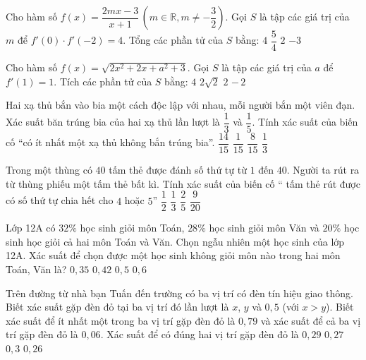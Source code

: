 \begin{ex}
Cho hàm số $f(x)=\dfrac{2mx-3}{x+1}\,\left(m\in \mathbb{R},m\ne -\dfrac{3}{2}\right)$. Gọi $S$ là tập các giá trị của $m$ để $f'(0) \cdot f'(-2)=4$. Tổng các phần tử của $S$ bằng:
\choice
{$4$}
{$\dfrac{5}{4}$}
{$2$}
{$-3$}
\end{ex}
\begin{ex}
Cho hàm số $f(x)=\sqrt{2x^2+2x+a^2+3}$. Gọi $S$ là tập các giá trị của $a$ để $f'(1)=1$. Tích các phần tử của $S$ bằng:
\choice
{$4$}
{$2\sqrt{2}$}
{$2$}
{$-\,2$}
\end{ex}
\begin{ex}
Hai xạ thủ bắn vào bia một cách độc lập với nhau, mỗi người bắn một viên đạn. Xác suất băn trúng bia của hai xạ thủ lần lượt là $\dfrac{1}{3}$ và $\dfrac{1}{5}$. Tính xác suất của biến cố “có ít nhất một xạ thủ không bắn trúng bia”.
\choice
{$\dfrac{14}{15}$}
{$\dfrac{1}{15}$}
{$\dfrac{8}{15}$}
{$\dfrac{1}{3}$}
\end{ex}
\begin{ex}
Trong một thùng có $40$ tấm thẻ được đánh số thứ tự từ $1$ đến $40$. Người ta rút ra từ thùng phiếu một tấm thẻ bất kì. Tính xác suất của biến cố “ tấm thẻ rút được có số thứ tự chia hết cho $4$ hoặc $5$”
\choice
{$\dfrac{1}{2}$}
{$\dfrac{1}{3}$}
{$\dfrac{2}{5}$}
{$\dfrac{9}{20}$}
\end{ex}
\begin{ex}
Lớp 12A có $32\%$ học sinh giỏi môn Toán, $28\%$ học sinh giỏi môn Văn và $20\%$ học sinh học giỏi cả hai môn Toán và Văn. Chọn ngẫu nhiên một học sinh của lớp 12A. Xác suất để chọn được một học sinh không giỏi môn nào trong hai môn Toán, Văn là?
\choice
{$0{,}35$}
{$0{,}42$}
{$0{,}5$}
{$0{,}6$}
\end{ex}
\begin{ex}
Trên đường từ nhà bạn Tuấn đến trường có ba vị trí có đèn tín hiệu giao thông. Biết xác suất gặp đèn đỏ tại ba vị trí đó lần lượt là $x$, $y$ và $0{,}5$ (với $x>y$). Biết xác suất để ít nhất một trong ba vị trí gặp đèn đỏ là $0{,}79$ và xác suất để cả ba vị trí gặp đèn đỏ là $0{,}06$. Xác suất để có đúng hai vị trí gặp đèn đỏ là
\choice
{$0{,}29$}
{$0{,}27$}
{$0{,}3$}
{$0{,}26$}
\end{ex}

